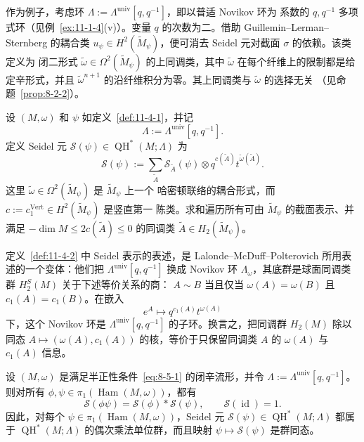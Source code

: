 作为例子，考虑环 $\Lambda:=\Lambda^{\mathrm{univ}}[q,q^{-1}]$，即以普适 Novikov 环为
系数的 $q,q^{-1}$ 多项式环（见例~\ref{ex:11-1-4}(v)）。变量 $q$ 的次数为二。借助
Guillemin--Lerman--Sternberg  的耦合类
$u_\psi\in H^2(\widetilde M_\psi)$，便可消去 Seidel 元对截面 $\sigma$ 的依赖。该类定义为
闭二形式 $\widetilde\omega\in\Omega^2(\widetilde M_\psi)$ 的上同调类，其中
$\widetilde\omega$ 在每个纤维上的限制都是给定辛形式，并且
$\widetilde\omega^{n+1}$ 的沿纤维积分为零。其上同调类与 $\widetilde\omega$ 的选择无关
（见命题~\ref{prop:8-2-2}）。

\begin{definition}\label{def:11-4-2}
设 $(M,\omega)$ 和 $\psi$ 如定义~\ref{def:11-4-1}，并记
\[
  \Lambda:=\Lambda^{\mathrm{univ}}[q,q^{-1}].
\]
定义 Seidel 元 $\mathcal S(\psi)\in\operatorname{QH}^*(M;\Lambda)$ 为
\begin{equation}\label{eq:11-4-3}
  \mathcal S(\psi)
  :=\sum_{\widetilde A}
  \mathcal S_{\widetilde A}(\psi)
  \otimes q^{c(\widetilde A)}t^{\widetilde\omega(\widetilde A)}.
\end{equation}
这里 $\widetilde\omega\in\Omega^2(\widetilde M_\psi)$ 是 $\widetilde M_\psi$ 上一个
哈密顿联络的耦合形式，而 $c:=c_1^{\mathrm{Vert}}\in H^2(\widetilde M_\psi)$ 是竖直第一
陈类。求和遍历所有可由 $\widetilde M_\psi$ 的截面表示、并满足
$-\dim M\le2c(\widetilde A)\le0$ 的同调类
$\widetilde A\in H_2(\widetilde M_\psi)$。
\end{definition}

定义~\ref{def:11-4-2} 中 Seidel 表示的表述，是 Lalonde--McDuff--Polterovich
 所用表述的一个变体：他们把 $\Lambda^{\mathrm{univ}}[q,q^{-1}]$ 换成
Novikov 环 $\Lambda_\omega$，其底群是球面同调类群 $H_2^S(M)$ 关于下述等价关系的商：
$A\sim B$ 当且仅当 $\omega(A)=\omega(B)$ 且 $c_1(A)=c_1(B)$。在嵌入
\[
  e^A\longmapsto q^{c_1(A)}t^{\omega(A)}
\]
下，这个 Novikov 环是 $\Lambda^{\mathrm{univ}}[q,q^{-1}]$ 的子环。换言之，把同调群
$H_2(M)$ 除以同态 $A\mapsto(\omega(A),c_1(A))$ 的核，等价于只保留同调类 $A$ 的
$\omega(A)$ 与 $c_1(A)$ 信息。

\begin{theorem}[Seidel]\label{thm:11-4-3}
设 $(M,\omega)$ 是满足半正性条件~\eqref{eq:8-5-1} 的闭辛流形，并令
$\Lambda:=\Lambda^{\mathrm{univ}}[q,q^{-1}]$。则对所有
$\phi,\psi\in\pi_1(\operatorname{Ham}(M,\omega))$，都有
\[
  \mathcal S(\phi\psi)=\mathcal S(\phi)*\mathcal S(\psi),
  \qquad
  \mathcal S(\operatorname{id})=1.
\]
因此，对每个 $\psi\in\pi_1(\operatorname{Ham}(M,\omega))$，Seidel 元
$\mathcal S(\psi)\in\operatorname{QH}^*(M;\Lambda)$ 都属于
$\operatorname{QH}^*(M;\Lambda)$ 的偶次乘法单位群，而且映射
$\psi\mapsto\mathcal S(\psi)$ 是群同态。
\end{theorem}

